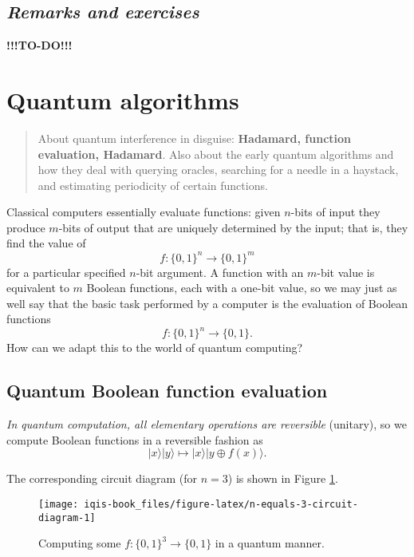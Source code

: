 \documentclass[fleqn]{article}
\let\oldsection\section
\renewcommand\section{\clearpage\oldsection}
\begin{document}
\hypertarget{remarks-and-exercises-7}{%
\subsection{\texorpdfstring{\emph{Remarks and exercises}}{Remarks and exercises}}\label{remarks-and-exercises-7}}

\textbf{!!!TO-DO!!!}

\hypertarget{chapter10}{%
\section{Quantum algorithms}\label{chapter10}}

\begin{quote}
About quantum interference in disguise: \textbf{Hadamard, function evaluation, Hadamard}.
Also about the early quantum algorithms and how they deal with querying oracles, searching for a needle in a haystack, and estimating periodicity of certain functions.
\end{quote}

Classical computers essentially evaluate functions: given \(n\)-bits of input they produce \(m\)-bits of output that are uniquely determined by the input; that is, they find the value of
\[
  f\colon \{0,1\}^n \to \{0,1\}^m
\]
for a particular specified \(n\)-bit argument.
A function with an \(m\)-bit value is equivalent to \(m\) Boolean functions, each with a one-bit value, so we may just as well say that the basic task performed by a computer is the evaluation of Boolean functions
\[
  f\colon \{0,1\}^n \to  \{0,1\}.
\]
How can we adapt this to the world of quantum computing?

\hypertarget{quantum-boolean-function-evaluation}{%
\subsection{Quantum Boolean function evaluation}\label{quantum-boolean-function-evaluation}}

\emph{In quantum computation, all elementary operations are reversible} (unitary), so we compute Boolean functions in a reversible fashion as
\[
  |x\rangle|y\rangle \mapsto |x\rangle|y\oplus f(x)\rangle.
\]

The corresponding circuit diagram (for \(n=3\)) is shown in Figure \ref{fig:n-equals-3-circuit-diagram}.



\begin{figure}[H]

{\centering \texttt{[image: iqis-book\_files/figure-latex/n-equals-3-circuit-diagram-1]} 

}

\caption{Computing some \(f\colon\{0,1\}^3\to\{0,1\}\) in a quantum manner.}\label{fig:n-equals-3-circuit-diagram}
\end{figure}
\end{document}
